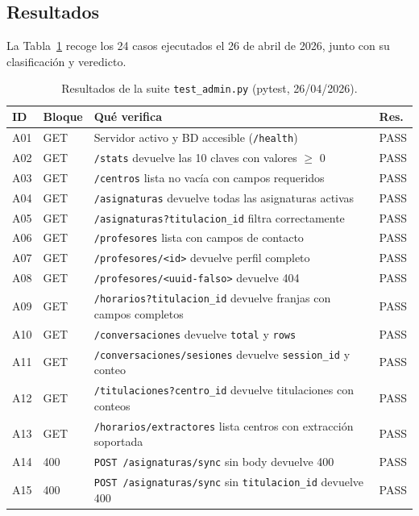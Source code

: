 \subsection{Resultados}\label{subsec:admin-resultados}

La Tabla~\ref{tab:admin-resultados} recoge los 24 casos ejecutados el 26 de abril de 2026, junto con su clasificación y veredicto.

\begin{table}[hbtp]
\centering
\caption{Resultados de la suite \texttt{test\_admin.py} (pytest, 26/04/2026).}\label{tab:admin-resultados}
\small
\begin{tabular}{p{0.6cm}p{1.4cm}p{10.0cm}p{0.8cm}}
\hline
\textbf{ID} & \textbf{Bloque} & \textbf{Qué verifica} & \textbf{Res.} \\
\hline
A01 & GET & Servidor activo y BD accesible (\texttt{/health}) & PASS \\
A02 & GET & \texttt{/stats} devuelve las 10 claves con valores $\geq$ 0 & PASS \\
A03 & GET & \texttt{/centros} lista no vacía con campos requeridos & PASS \\
A04 & GET & \texttt{/asignaturas} devuelve todas las asignaturas activas & PASS \\
A05 & GET & \texttt{/asignaturas?titulacion\_id} filtra correctamente & PASS \\
A06 & GET & \texttt{/profesores} lista con campos de contacto & PASS \\
A07 & GET & \texttt{/profesores/<id>} devuelve perfil completo & PASS \\
A08 & GET & \texttt{/profesores/<uuid-falso>} devuelve 404 & PASS \\
A09 & GET & \texttt{/horarios?titulacion\_id} devuelve franjas con campos completos & PASS \\
A10 & GET & \texttt{/conversaciones} devuelve \texttt{total} y \texttt{rows} & PASS \\
A11 & GET & \texttt{/conversaciones/sesiones} devuelve \texttt{session\_id} y conteo & PASS \\
A12 & GET & \texttt{/titulaciones?centro\_id} devuelve titulaciones con conteos & PASS \\
A13 & GET & \texttt{/horarios/extractores} lista centros con extracción soportada & PASS \\
\hline
A14 & 400 & \texttt{POST /asignaturas/sync} sin body devuelve 400 & PASS \\
A15 & 400 & \texttt{POST /asignaturas/sync} sin \texttt{titulacion\_id} devuelve 400 & PASS \\

\end{tabular}
\end{table}
